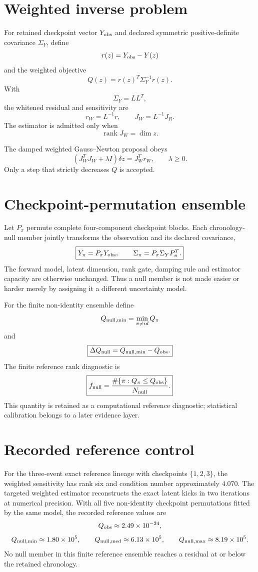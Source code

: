 \section{Weighted inverse problem}

For retained checkpoint vector $Y_{\rm obs}$ and declared symmetric positive-definite covariance $\Sigma_Y$, define
\[
r(z)=Y_{\rm obs}-Y(z)
\]
and the weighted objective
\[
\boxed{
Q(z)=r(z)^T\Sigma_Y^{-1}r(z).
}
\]
With
\[
\Sigma_Y=LL^T,
\]
the whitened residual and sensitivity are
\[
r_W=L^{-1}r,
\qquad
J_W=L^{-1}J_R.
\]
The estimator is admitted only when
\[
\boxed{\operatorname{rank}J_W=\dim z.}
\]

The damped weighted Gauss--Newton proposal obeys
\[
\boxed{
(J_W^TJ_W+\lambda I)\delta z=J_W^Tr_W,
\qquad \lambda\ge0.
}
\]
Only a step that strictly decreases $Q$ is accepted.

\section{Checkpoint-permutation ensemble}

Let $P_\pi$ permute complete four-component checkpoint blocks. Each chronology-null member jointly transforms the observation and its declared covariance,
\[
\boxed{
Y_\pi=P_\pi Y_{\rm obs},
\qquad
\Sigma_\pi=P_\pi\Sigma_YP_\pi^T.
}
\]
The forward model, latent dimension, rank gate, damping rule and estimator capacity are otherwise unchanged. Thus a null member is not made easier or harder merely by assigning it a different uncertainty model.

For the finite non-identity ensemble define
\[
Q_{\rm null,min}=\min_{\pi\ne id}Q_\pi
\]
and
\[
\boxed{
\Delta Q_{\rm null}=Q_{\rm null,min}-Q_{\rm obs}.
}
\]
The finite reference rank diagnostic is
\[
\boxed{
f_{\rm null}=\frac{\#\{\pi:Q_\pi\le Q_{\rm obs}\}}{N_{\rm null}}.
}
\]
This quantity is retained as a computational reference diagnostic; statistical calibration belongs to a later evidence layer.

\section{Recorded reference control}

For the three-event exact reference lineage with checkpoints $\{1,2,3\}$, the weighted sensitivity has rank six and condition number approximately $4.070$. The targeted weighted estimator reconstructs the exact latent kicks in two iterations at numerical precision. With all five non-identity checkpoint permutations fitted by the same model, the recorded reference values are
\[
Q_{\rm obs}\approx2.49\times10^{-24},
\]
\[
Q_{\rm null,min}\approx1.80\times10^5,
\qquad
Q_{\rm null,med}\approx6.13\times10^5,
\qquad
Q_{\rm null,max}\approx8.19\times10^5.
\]
No null member in this finite reference ensemble reaches a residual at or below the retained chronology.

